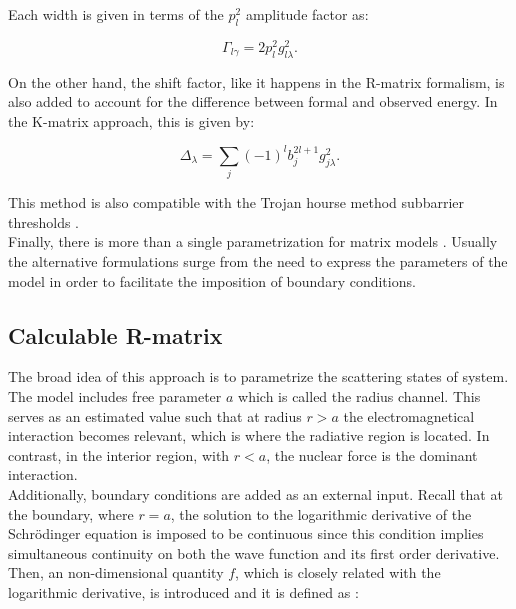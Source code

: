 \documentclass[openany]{book}
\begin{document}
Each width is given in terms of the $p^2_l$ amplitude factor as:

\begin{equation}\label{eq:rmatrix_kmatrix_witdh}
	\Gamma_{l\gamma} = 2p^2_l g^2_{l\lambda}.
\end{equation}

On the other hand, the shift factor, like it happens in the R-matrix formalism, is also added to account for the difference between formal and observed energy. In the K-matrix approach, this is given by:

\begin{equation}\label{eq:rmatrix_kmatrix_shift}
	\Delta_\lambda = \sum_{j} (-1)^l b^{2l + 1}_j g^2_{j\lambda}.
\end{equation}


This method is also compatible with the Trojan hourse method subbarrier thresholds \cite{mukhamedzhanov_shubhchintak_bertulani_2017}. \\

Finally, there is more than a single parametrization for matrix models \cite{brune_2002}. Usually the alternative formulations surge from the need to express the parameters of the model in order to facilitate the imposition of boundary conditions.  

\subsection{Calculable R-matrix} \label{sub:rmatrix_calculable}

The broad idea of this approach is to parametrize the scattering states of system.  The model includes free parameter $a$ which is called the radius channel. This serves as an estimated value such that at radius $r > a$ the electromagnetical interaction becomes relevant, which is where the radiative region is located. In contrast, in the interior region, with $r < a$, the nuclear force is the dominant interaction. \\

Additionally, boundary conditions are added as an external input. Recall that at the boundary, where $r = a$, the solution to the logarithmic derivative of the Schrödinger equation is imposed to be continuous since this condition implies simultaneous continuity on both the wave function and its first order derivative. Then, an non-dimensional quantity $f$, which is closely related with the logarithmic derivative, is introduced and it is defined as \cite{iliadis_2015}:
\end{document}
